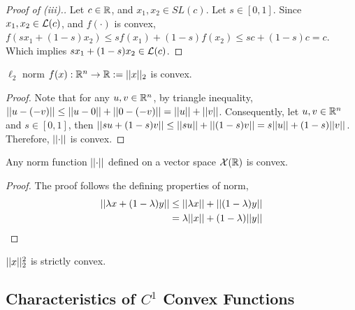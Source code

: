 \documentclass{article}
\begin{document}
    \begin{proof}[Proof of (iii).]
    	Let $c \in \mathbb{R}$, and $x_1 ,x_2 \in SL(c)$. Let $s \in [0, 1]$. Since $x_1, x_2 \in \mathcal{{L}}(c)$, and $f(\cdot)$ is convex, $f(s x_1 + (1-s) x_2) \leq s f(x_1) + (1-s) f(x_2) \leq s c + (1-s) c = c$. Which implies $s x_1 + (1-s) x_2 \in \mathcal{{L}}(c)$.
    \end{proof}
    
    \begin{example}
    	$\ell_2$ norm $f(x): \mathbb{R}^n \to \mathbb{R} := \vert \vert {x} \vert \vert_2$ is convex.
    \end{example}
    
    \begin{proof}
    	Note that for any $u, v \in \mathbb{R}^n$, by triangle inequality, $\vert \vert {u - (-v)} \vert \vert \leq \vert \vert {u - 0} \vert \vert + \vert \vert {0 - (-v)} \vert \vert = \vert \vert {u} \vert \vert + \vert \vert {v} \vert \vert$. Consequently, let $u, v \in \mathbb{R}^n$ and $s \in [0, 1]$, then $\vert \vert {s u + (1-s) v} \vert \vert \leq \vert \vert {su} \vert \vert + \vert \vert {(1-s) v} \vert \vert = s \vert \vert {u} \vert \vert + (1-s) \vert \vert {v} \vert \vert$. Therefore, $\vert \vert {\cdot} \vert \vert$ is convex.
    \end{proof}
    
    \begin{proposition}
    	Any norm function $\vert \vert {\cdot} \vert \vert$ defined on a vector space $\mathcal{{X}}(\mathbb{R})$ is convex.
    \end{proposition}
    
    \begin{proof}
    	The proof follows the defining properties of norm,
    	\begin{align}
    		\vert \vert {\lambda x + (1 - \lambda) y} \vert \vert &\leq \vert \vert {\lambda x} \vert \vert  + \vert \vert {(1 - \lambda) y} \vert \vert \\
    		&= \lambda \vert \vert {x} \vert \vert + (1 - \lambda) \vert \vert {y} \vert \vert
    	\end{align}
    \end{proof}
    
    \begin{proposition}
    	$\vert \vert {x} \vert \vert_2^2$ is strictly convex.
    \end{proposition}
	
	\subsection{Characteristics of $C^1$ Convex Functions}
	
\end{document}
